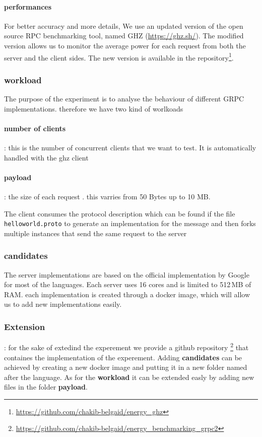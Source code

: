 \paragraph{performances}
For better accuracy and more details, We use an updated version of the open source RPC benchmarking tool, named GHZ (\url{https://ghz.sh/}).
The modified version allows us to monitor the average power for each request from both the server and the client sides.
The new version is available in the repository\footnote{\url{https://github.com/chakib-belgaid/energy_ghz}}.

\subsubsection{workload}
The purpose of the experiment is to analyse the behaviour of different GRPC implementations. therefore we have two kind of worlkoads 
\paragraph{number of clients}: this is the number of concurrent clients that we want to test. It is automatically handled with the ghz client 
\paragraph{payload}: the size of each request . this varries from 50 Bytes up to 10 MB.

The client consumes the protocol description which can be found if the file \texttt{helloworld.proto} to generate an implementation for the message  and then forks multiple instances that send the same request to the server 

\subsubsection*{candidates}
The server implementations are based on the official implementation by Google for most of the languages.
Each server uses 16 cores and is limited to 512\,MB of RAM.
each implementation is created through a docker image, which will allow us to add new implementations easily.

\subsubsection{Extension}: 
for the sake of extedind the experement we provide a github repository \footnote{\url{https://github.com/chakib-belgaid/energy_benchmarking_grpc2}} that containes the implementation of the experement.
Adding \textbf{candidates} can be achieved by creating a new docker image and putting it in a new folder named after the language.
As for the \textbf{workload} it can be extended easly by adding new files in the folder \textbf{payload}.
 



